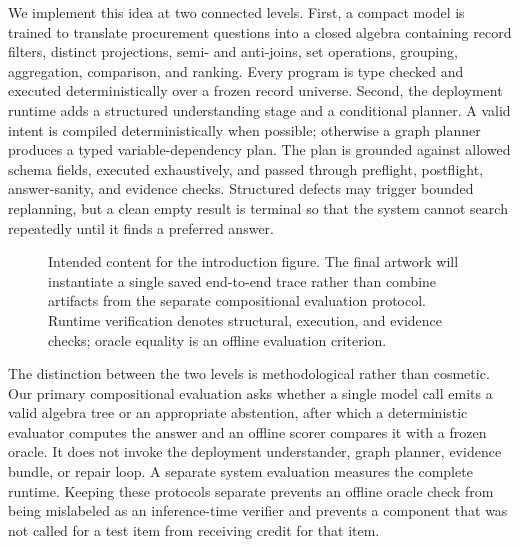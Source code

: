 We implement this idea at two connected levels.  First, a compact model is trained to translate
procurement questions into a closed algebra containing record filters, distinct projections,
semi- and anti-joins, set operations, grouping, aggregation, comparison, and ranking.  Every
program is type checked and executed deterministically over a frozen record universe.  Second,
the deployment runtime adds a structured understanding stage and a conditional planner.  A
valid intent is compiled deterministically when possible; otherwise a graph planner produces a
typed variable-dependency plan.  The plan is grounded against allowed schema fields, executed
exhaustively, and passed through preflight, postflight, answer-sanity, and evidence checks.
Structured defects may trigger bounded replanning, but a clean empty result is terminal so that
the system cannot search repeatedly until it finds a preferred answer.

\begin{figure}[t]
  \centering
  \caption{Intended content for the introduction figure.  The final artwork will instantiate a
  single saved end-to-end trace rather than combine artifacts from the separate compositional
  evaluation protocol.  Runtime verification denotes structural, execution, and evidence
  checks; oracle equality is an offline evaluation criterion.}
  \label{fig:visual-thesis}
\end{figure}

The distinction between the two levels is methodological rather than cosmetic.  Our primary
compositional evaluation asks whether a single model call emits a valid algebra tree or an
appropriate abstention, after which a deterministic evaluator computes the answer and an
offline scorer compares it with a frozen oracle.  It does not invoke the deployment
understander, graph planner, evidence bundle, or repair loop.  A separate system evaluation
measures the complete runtime.  Keeping these protocols separate prevents an offline oracle
check from being mislabeled as an inference-time verifier and prevents a component that was not
called for a test item from receiving credit for that item.

